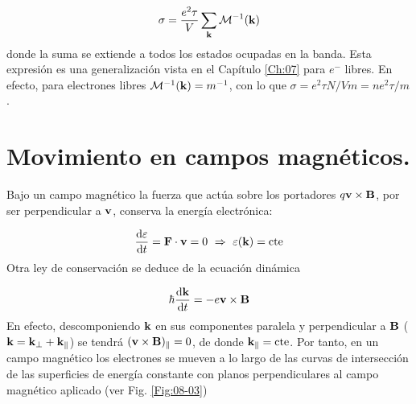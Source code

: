 \begin{equation}
	\sigma = \frac{e^2 \tau}{V} \sum_{\mathbf{k}} \mathcal{M}^{-1} (\mathbf{k})
\end{equation}
donde la suma se extiende a todos los estados ocupadas en la banda. Esta expresión es una generalización vista en el Capítulo \ref{Ch:07} para $e^-$ libres. En efecto, para electrones libres $\mathcal{M}^{-1} (\mathbf{k}) = m^{-1}$, con lo que $\sigma = e^2 \tau N / V m = ne^2 \tau / m$.

\section{Movimiento en campos magnéticos.}

Bajo un campo magnético la fuerza que actúa sobre los portadores $q\mathbf{v} \times \mathbf{B}$, por ser perpendicular a $\mathbf{v}$, conserva la energía electrónica:

\begin{equation}
	\frac{\mathrm{d} \varepsilon}{\mathrm{d} t} = \mathbf{F} \cdot \mathbf{v} = 0 \ \Rightarrow \ \varepsilon(\mathbf{k}) = \text{cte}
\end{equation}
Otra ley de conservación se deduce de la ecuación dinámica 

\begin{equation*}
	\hbar \frac{\mathrm{d} \mathbf{k}}{\mathrm{d} t} = - e \mathbf{v} \times \mathbf{B}
\end{equation*}
En efecto, descomponiendo $\mathbf{k}$ en sus componentes paralela y perpendicular a $\mathbf{B}$ ($\mathbf{k} = \mathbf{k}_\perp + \mathbf{k}_\parallel $) se tendrá $(\mathbf{v} \times \mathbf{B})_\parallel =0$, de donde $\mathbf{k}_\parallel=\text{cte}$. Por tanto, en un campo magnético los electrones se mueven a lo largo de las curvas de intersección de las superficies de energía constante con planos perpendiculares al campo magnético aplicado (ver Fig. \ref{Fig:08-03})

